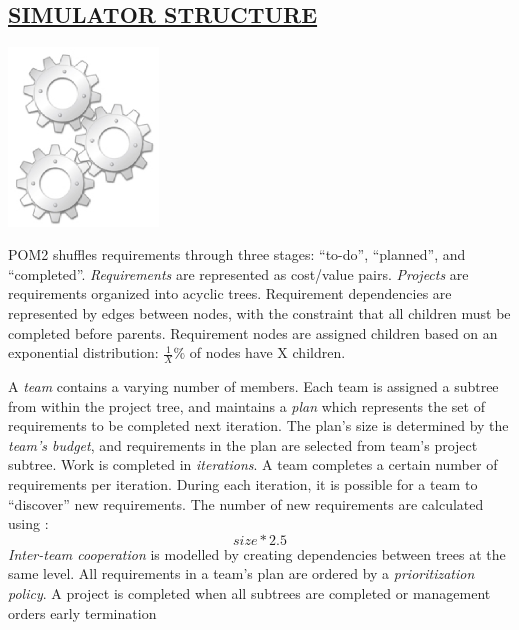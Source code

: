 \begin{kasten}
  \section*{ \hspace{0.1cm} {\color{red} \underline{SIMULATOR STRUCTURE}}}
\large{
  \begin{minipage}{5cm}
   \includegraphics[width=4cm]{gear.eps}
 \end{minipage}
\begin{minipage}{8cm}
POM2 shuffles requirements through three stages: ``to-do'', ``planned'', and ``completed''.
\textit{Requirements} are represented as cost/value pairs. 
\textit{Projects} are requirements organized into acyclic trees. 
Requirement dependencies are represented by edges between nodes, with 
the constraint that all children must be completed before parents.
Requirement nodes are assigned children based on an exponential distribution: 
\begin{math} \frac{1}{X} \% \end{math} of nodes have X children.
\end{minipage} 

\vspace{3mm}
A \textit{team} contains a varying number of members. Each team is assigned a subtree from within 
the project tree, and maintains a \textit{plan} which represents the set of requirements to be completed next iteration.
The plan's size is determined by the \textit{team's budget}, and requirements in the plan are selected from 
team's project subtree. Work is completed in \textit{iterations}. A team completes a certain number of requirements 
per iteration. During each iteration, it is possible for a team to ``discover'' new requirements.  
The number of new requirements are calculated using : 
\begin{equation}\label{eq:size}size * 2.5\end{equation}
\textit{Inter-team cooperation} is modelled by creating dependencies between trees at the same level.
All requirements in a team's plan are ordered by a \textit{prioritization policy}. 
A project is completed when all subtrees are completed or management orders early termination

}
\end{kasten}

